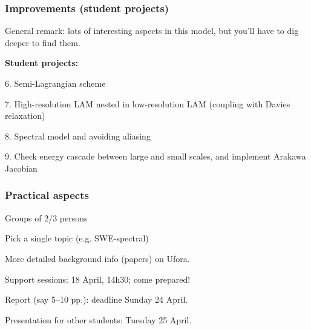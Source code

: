 \documentclass[aspectratio=43,9pt]{beamer}
\begin{document}
%
%
\begin{frame}
	\frametitle{Improvements (student projects)}
	General remark: lots of interesting aspects in this model, but you'll have to dig deeper to find them.
	\par\vspace*{4ex}
	{\bf Student projects:}
	\begin{myitemize}{1ex}
		\item[6.] Semi-Lagrangian scheme
		\item[7.] High-resolution LAM nested in low-resolution LAM (coupling with Davies relaxation)
		\item[8.] Spectral model and avoiding aliasing
		\item[9.] Check energy cascade between large and small scales, and implement Arakawa Jacobian
	\end{myitemize}
\end{frame}
%
%
\begin{frame}
	\frametitle{Practical aspects}
	\begin{myitemize}{2ex}
		\item Groups of 2/3 persons
		\item Pick a single topic (e.g. SWE-spectral)
		\item More detailed background info (papers) on Ufora.
		\item Support sessions: 18 April, 14h30; come prepared!
		\item Report (say 5--10 pp.): deadline Sunday 24 April.
		\item Presentation for other students: Tuesday 25 April.
	\end{myitemize}
\end{frame}
%
%
\end{document}
